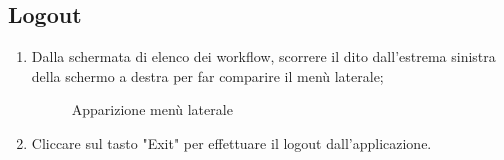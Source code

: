 \subsection{Logout}
\begin{enumerate}
	\item Dalla schermata di elenco dei workflow, scorrere il dito dall'estrema sinistra della schermo a destra per far comparire il menù laterale;
	\begin{figure}[!ht]
		\centering
		\caption{Apparizione menù laterale}
	\end{figure}
\newpage
	\item Cliccare sul tasto "Exit" per effettuare il logout dall'applicazione.

\end{enumerate}
